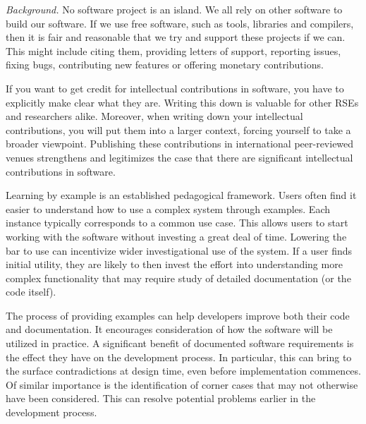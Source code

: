 \documentclass[a4paper,UKenglish]{dagman}
\begin{document}
\emph{Background.}
No software project is an island. We all rely on other software to build our software. If we use free software, such as tools, libraries and compilers, then it is fair and reasonable that we try and support these projects if we can. This might include citing them, providing letters of support, reporting issues, fixing bugs, contributing new features or offering monetary contributions.

If you want to get credit for intellectual contributions in software, you have to explicitly make clear what they are. Writing this down is valuable for other RSEs and researchers alike. Moreover, when writing down your intellectual contributions, you will put them into a larger context, forcing yourself to take a broader viewpoint. Publishing these contributions in international peer-reviewed venues strengthens and legitimizes the case that there are significant intellectual contributions in software.


Learning by example is an established pedagogical framework. Users often find it easier to understand how to use a complex system through examples. Each instance typically corresponds to a common use case. This allows users to start working with the software without investing a great deal of time. Lowering the bar to use can incentivize wider investigational use of the system. If a user finds initial utility, they are likely to then invest the effort into understanding more complex functionality that may require study of detailed documentation (or the code itself).

The process of providing examples can help developers improve both their code and documentation. It encourages consideration of how the software will be utilized in practice. A significant benefit of documented software requirements is the effect they have on the development process. In particular, this can bring to the surface contradictions at design time, even before implementation commences. Of similar importance is the identification of corner cases that may not otherwise have been considered. This can resolve potential problems earlier in the development process.
\end{document}
